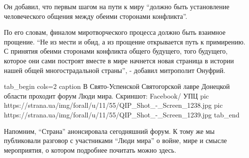 Он добавил, что первым шагом на пути к миру \enquote{должно быть установление
человеческого общения между обеими сторонами конфликта}.

По его словам, финалом миротворческого процесса должно быть взаимное
прощение. \enquote{Не из мести и обид, а из прощение открывается путь к
примирению. С принятия обеими сторонами конфликта общего будущего, того
будущего, которое они сами построят вместе в мире начнется новая страница
в истории нашей общей многострадальной страны}, - добавил  митрополит
Онуфрий.

\ifcmt
tab_begin cols=2
	caption В Свято-Успенской Святогорской лавре Донецкой области проходит форум Люди мира. Скриншот: Facebook/ УПЦ
	pic https://strana.ua/img/forall/u/11/55/QIP_Shot_-_Screen_1238.jpg
	pic https://strana.ua/img/forall/u/11/55/QIP_Shot_-_Screen_1239.jpg
tab_end
\fi

Напомним, \enquote{Страна} анонсировала сегодняшний форум. К тому же мы
публиковали разговор с участниками \enquote{Люди мира} о войне, мире и смысле
мероприятия, о котором подробнее почитать можно
здесь.

